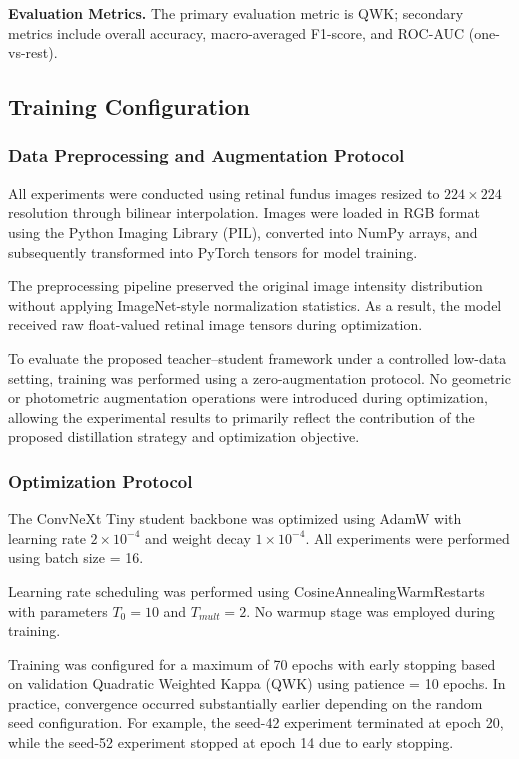\documentclass[a4paper,fleqn]{cas-dc}
\begin{document}
\textbf{Evaluation Metrics.} The primary evaluation metric is QWK; secondary metrics include overall accuracy, macro-averaged F1-score, and ROC-AUC (one-vs-rest).


\subsection{Training Configuration}

\subsubsection{Data Preprocessing and Augmentation Protocol}

All experiments were conducted using retinal fundus images resized to $224 \times 224$ resolution through bilinear interpolation. Images were loaded in RGB format using the Python Imaging Library (PIL), converted into NumPy arrays, and subsequently transformed into PyTorch tensors for model training.

The preprocessing pipeline preserved the original image intensity distribution without applying ImageNet-style normalization statistics. As a result, the model received raw float-valued retinal image tensors during optimization.

To evaluate the proposed teacher--student framework under a controlled low-data setting, training was performed using a zero-augmentation protocol. No geometric or photometric augmentation operations were introduced during optimization, allowing the experimental results to primarily reflect the contribution of the proposed distillation strategy and optimization objective.

\subsubsection{Optimization Protocol}

The ConvNeXt Tiny student backbone was optimized using AdamW with learning rate $2 \times 10^{-4}$ and weight decay $1 \times 10^{-4}$. All experiments were performed using batch size = 16.

Learning rate scheduling was performed using CosineAnnealingWarmRestarts with parameters $T_0 = 10$ and $T_{mult}=2$. No warmup stage was employed during training.

Training was configured for a maximum of 70 epochs with early stopping based on validation Quadratic Weighted Kappa (QWK) using patience = 10 epochs. In practice, convergence occurred substantially earlier depending on the random seed configuration. For example, the seed-42 experiment terminated at epoch 20, while the seed-52 experiment stopped at epoch 14 due to early stopping.
\end{document}
